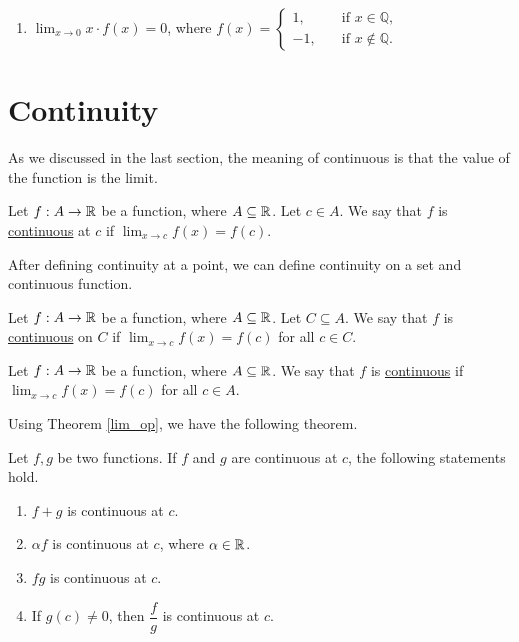 \documentclass[11pt]{book}
\begin{document}
\begin{enumerate}[label=\arabic*.]
\begin{enumerate}
            \setlength{\delimitershortfall}{13.5pt}
            \item $\displaystyle\lim_{x\to 0}x\cdot f(x)=0$, where $f(x)=\left\{\begin{array}{ll}
                1,\quad & \text{if $x\in\mathbb{Q}$},\\
                -1,\quad & \text{if $x\notin\mathbb{Q}$}.
            \end{array}\right.$
            \setlength{\delimitershortfall}{0pt}
        \end{enumerate}
    \setlength{\delimitershortfall}{13.5pt}
\end{enumerate}

\section{Continuity}

As we discussed in the last section, the meaning of continuous is that the value of the function is the limit.

\begin{definition}[Continuous]
    Let $f:A\to\mathbb{R}$ be a function, where $A\subseteq\mathbb{R}$. Let $c\in A$. We say that $f$ is \underline{continuous} at $c$ if $\displaystyle\lim_{x\to c}f(x)=f(c)$.
\end{definition}

After defining continuity at a point, we can define continuity on a set and continuous function.

\begin{definition}[Continuous]
    Let $f:A\to\mathbb{R}$ be a function, where $A\subseteq\mathbb{R}$. Let $C\subseteq A$. We say that $f$ is \underline{continuous} on $C$ if $\displaystyle\lim_{x\to c}f(x)=f(c)$ for all $c\in C$.
\end{definition}

\begin{definition}[Continuous]
    Let $f:A\to\mathbb{R}$ be a function, where $A\subseteq\mathbb{R}$. We say that $f$ is \underline{continuous} if $\displaystyle\lim_{x\to c}f(x)=f(c)$ for all $c\in A$.
\end{definition}

Using Theorem \ref{lim_op}, we have the following theorem.

\begin{theorem}\label{conti_op}
    Let $f, g$ be two functions. If $f$ and $g$ are continuous at $c$, the following statements hold.
    \begin{enumerate}
        \item $f+g$ is continuous at $c$.
        \item $\alpha f$ is continuous at $c$, where $\alpha\in\mathbb{R}$.
        \item $fg$ is continuous at $c$.
        \item If $g(c)\ne0$, then $\dfrac{f}{g}$ is continuous at $c$.
    \end{enumerate}
\end{theorem}
\end{document}
